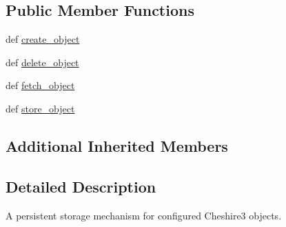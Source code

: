 \subsection*{Public Member Functions}
\begin{DoxyCompactItemize}
\item 
def \hyperlink{classcheshire3_1_1base_objects_1_1_object_store_a7ef2ecb30253bc416275ce79a14e1a6e}{create\-\_\-object}
\item 
def \hyperlink{classcheshire3_1_1base_objects_1_1_object_store_a86360fddb8399503bf929d9eed3707f0}{delete\-\_\-object}
\item 
def \hyperlink{classcheshire3_1_1base_objects_1_1_object_store_a605828bfc0ccabdddac9b53d853b37e5}{fetch\-\_\-object}
\item 
def \hyperlink{classcheshire3_1_1base_objects_1_1_object_store_a02185c38d8b43872ddc0287efba81d79}{store\-\_\-object}
\end{DoxyCompactItemize}
\subsection*{Additional Inherited Members}


\subsection{Detailed Description}
\begin{DoxyVerb}A persistent storage mechanism for configured Cheshire3 objects.\end{DoxyVerb}
 

